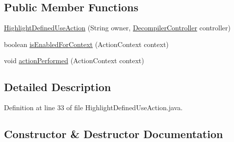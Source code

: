 \subsection*{Public Member Functions}
\begin{DoxyCompactItemize}
\item 
\mbox{\hyperlink{classghidra_1_1app_1_1plugin_1_1core_1_1decompile_1_1actions_1_1_highlight_defined_use_action_a2c9919d164b3af4af5014e64ca6aef03}{Highlight\+Defined\+Use\+Action}} (String owner, \mbox{\hyperlink{classghidra_1_1app_1_1decompiler_1_1component_1_1_decompiler_controller}{Decompiler\+Controller}} controller)
\item 
boolean \mbox{\hyperlink{classghidra_1_1app_1_1plugin_1_1core_1_1decompile_1_1actions_1_1_highlight_defined_use_action_a583a431104b31a91221412fb9b7c0572}{is\+Enabled\+For\+Context}} (Action\+Context context)
\item 
void \mbox{\hyperlink{classghidra_1_1app_1_1plugin_1_1core_1_1decompile_1_1actions_1_1_highlight_defined_use_action_a65cdffc68c8e31b8a97aa59ad6f0183c}{action\+Performed}} (Action\+Context context)
\end{DoxyCompactItemize}


\subsection{Detailed Description}


Definition at line 33 of file Highlight\+Defined\+Use\+Action.\+java.



\subsection{Constructor \& Destructor Documentation}
\mbox{\label{classghidra_1_1app_1_1plugin_1_1core_1_1decompile_1_1actions_1_1_highlight_defined_use_action_a2c9919d164b3af4af5014e64ca6aef03}} 
